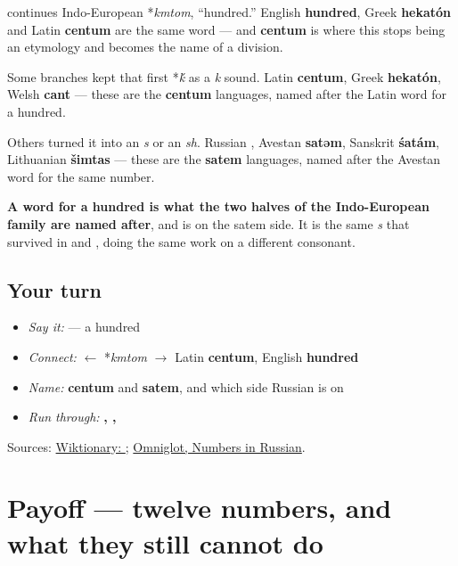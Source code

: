 \begin{cousinweb}
\textbf{} continues Indo-European *\emph{kmtom}, \textquotedblleft{}hundred.\textquotedblright{} English \textbf{hundred}, Greek \textbf{hekatón} and Latin \textbf{centum} are the same word — and \textbf{centum} is where this stops being an etymology and becomes the name of a division.

Some branches kept that first *\emph{\'{k}} as a \emph{k} sound. Latin \textbf{centum}, Greek \textbf{hekatón}, Welsh \textbf{cant} — these are the \textbf{centum} languages, named after the Latin word for a hundred.

Others turned it into an \emph{s} or an \emph{sh}. Russian \textbf{}, Avestan \textbf{satəm}, Sanskrit \textbf{śatám}, Lithuanian \textbf{šimtas} — these are the \textbf{satem} languages, named after the Avestan word for the same number.

\textbf{A word for a hundred is what the two halves of the Indo-European family are named after}, and \textbf{} is on the satem side. It is the same \emph{s} that survived in \textbf{} and \textbf{}, doing the same work on a different consonant.
\end{cousinweb}

\subsection*{Your turn}
\begin{itemize}
\raggedright
  \item \emph{Say it:} \textbf{} — a hundred
  \item \emph{Connect:} \textbf{} $\leftarrow$ *\emph{kmtom} $\to$ Latin \textbf{centum}, English \textbf{hundred}
  \item \emph{Name:} \textbf{centum} and \textbf{satem}, and which side Russian is on
  \item \emph{Run through:} \textbf{, , }
\end{itemize}

\begin{tcolorbox}[breakable,colback=teal!4,colframe=teal!35!black,title={Before you move on}]
Sources: \href{https://en.wiktionary.org/wiki/\%D1\%81\%D1\%82\%D0\%BE}{Wiktionary: }; \href{https://www.omniglot.com/language/numbers/russian.htm}{Omniglot, Numbers in Russian}.
\end{tcolorbox}
\section[Practice]{Payoff — twelve numbers, and what they still cannot do}

